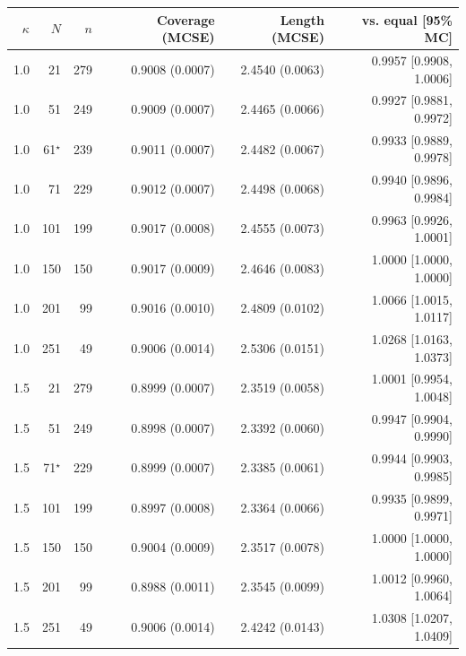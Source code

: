 \begin{longtable}{rrrrrr}
\toprule
$\kappa$ & $N$ & $n$ & Coverage (MCSE) & Length (MCSE) & vs. equal [95\% MC] \\
\midrule
\endhead
1.0 & 21 & 279 & 0.9008 (0.0007) & 2.4540 (0.0063) & 0.9957 [0.9908, 1.0006]\\
1.0 & 51 & 249 & 0.9009 (0.0007) & 2.4465 (0.0066) & 0.9927 [0.9881, 0.9972]\\
1.0 & 61$^\star$ & 239 & 0.9011 (0.0007) & 2.4482 (0.0067) & 0.9933 [0.9889, 0.9978]\\
1.0 & 71 & 229 & 0.9012 (0.0007) & 2.4498 (0.0068) & 0.9940 [0.9896, 0.9984]\\
1.0 & 101 & 199 & 0.9017 (0.0008) & 2.4555 (0.0073) & 0.9963 [0.9926, 1.0001]\\
1.0 & 150 & 150 & 0.9017 (0.0009) & 2.4646 (0.0083) & 1.0000 [1.0000, 1.0000]\\
1.0 & 201 & 99 & 0.9016 (0.0010) & 2.4809 (0.0102) & 1.0066 [1.0015, 1.0117]\\
1.0 & 251 & 49 & 0.9006 (0.0014) & 2.5306 (0.0151) & 1.0268 [1.0163, 1.0373]\\
1.5 & 21 & 279 & 0.8999 (0.0007) & 2.3519 (0.0058) & 1.0001 [0.9954, 1.0048]\\
1.5 & 51 & 249 & 0.8998 (0.0007) & 2.3392 (0.0060) & 0.9947 [0.9904, 0.9990]\\
1.5 & 71$^\star$ & 229 & 0.8999 (0.0007) & 2.3385 (0.0061) & 0.9944 [0.9903, 0.9985]\\
1.5 & 101 & 199 & 0.8997 (0.0008) & 2.3364 (0.0066) & 0.9935 [0.9899, 0.9971]\\
1.5 & 150 & 150 & 0.9004 (0.0009) & 2.3517 (0.0078) & 1.0000 [1.0000, 1.0000]\\
1.5 & 201 & 99 & 0.8988 (0.0011) & 2.3545 (0.0099) & 1.0012 [0.9960, 1.0064]\\
1.5 & 251 & 49 & 0.9006 (0.0014) & 2.4242 (0.0143) & 1.0308 [1.0207, 1.0409]\\
\bottomrule
\end{longtable}
